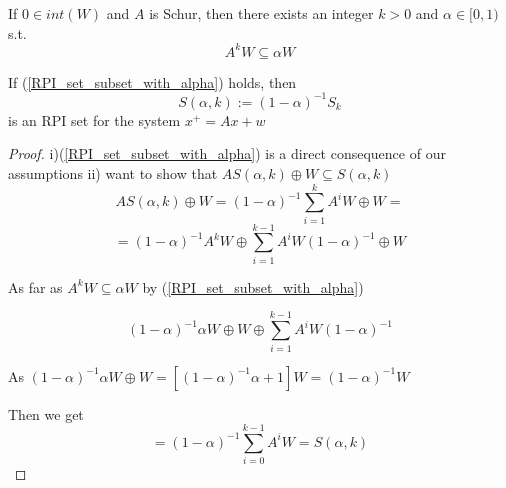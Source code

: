 \begin{Theorem}

If $0 \in int(W)$ and $A$ is Schur, then there exists an integer $k > 0$ and $\alpha \in [0,1)$ s.t.
\begin{equation}\label{RPI_set_subset_with_alpha}
A^kW \subseteq \alpha W
\end{equation} 

If (\ref{RPI_set_subset_with_alpha}) holds, then 
\begin{equation*}
S(\alpha,k) := (1-\alpha)^{-1}S_k
\end{equation*}
is an RPI set for the system $x^+ = Ax + w$

\begin{proof}

i)(\ref{RPI_set_subset_with_alpha}) is a direct consequence of our assumptions
ii) want to show that $AS(\alpha,k) \oplus W \subseteq S(\alpha,k)$
\begin{equation*}
AS(\alpha,k) \oplus W = (1-\alpha)^{-1} \sum_{i=1}^{k} A^iW \oplus W= 
\end{equation*}
\begin{equation*}
= (1 - \alpha)^{-1} A^kW \oplus \sum_{i=1}^{k-1}A^iW(1-\alpha)^{-1} \oplus W
\end{equation*}

As far as $A^kW \subseteq \alpha W$ by (\ref{RPI_set_subset_with_alpha})

\begin{equation*}
(1-\alpha)^{-1}\alpha W \oplus W \oplus \sum_{i=1}^{k-1}A^iW(1-\alpha)^{-1}
\end{equation*}

As $(1-\alpha)^{-1}\alpha W \oplus W = [(1-\alpha)^{-1} \alpha + 1]W = (1-\alpha)^{-1}W$

Then we get 
\begin{equation*}
= (1-\alpha)^{-1}\sum_{i=0}^{k-1}A^iW = S(\alpha,k)
\end{equation*}
\end{proof}
\end{Theorem}

